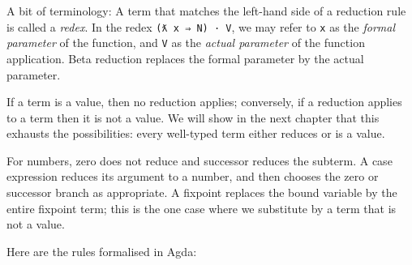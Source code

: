 A bit of terminology: A term that matches the left-hand side of a
reduction rule is called a \emph{redex}. In the redex
\texttt{(ƛ\ x\ ⇒\ N)\ ·\ V}, we may refer to \texttt{x} as the
\emph{formal parameter} of the function, and \texttt{V} as the
\emph{actual parameter} of the function application. Beta reduction
replaces the formal parameter by the actual parameter.

If a term is a value, then no reduction applies; conversely, if a
reduction applies to a term then it is not a value. We will show in the
next chapter that this exhausts the possibilities: every well-typed term
either reduces or is a value.

For numbers, zero does not reduce and successor reduces the subterm. A
case expression reduces its argument to a number, and then chooses the
zero or successor branch as appropriate. A fixpoint replaces the bound
variable by the entire fixpoint term; this is the one case where we
substitute by a term that is not a value.

Here are the rules formalised in Agda:

